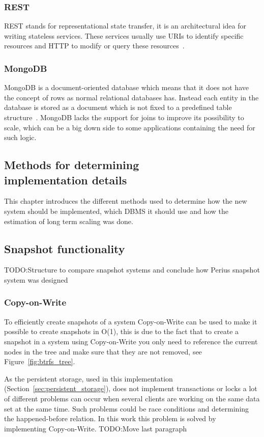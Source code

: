 \documentclass[a4paper,12pt]{article}
\newcommand{\fix}{\colorbox{yellow!30}{TODO:}}
\begin{document}
\subsubsection{REST} 
REST stands for representational state transfer, it is an architectural idea for writing stateless
services. These services usually use URIs to identify specific resources and HTTP to modify or query
these resources~\cite{REST}. 

\subsubsection{MongoDB}
MongoDB is a document-oriented database which means that it does not have the concept of rows as
normal relational databases has. Instead each entity in the database is stored as a document which
is not fixed to a predefined table structure~\cite{MONGODB}. MongoDB lacks the support for joins to
improve its possibility to scale, which can be a big down side to some applications containing the
need for such logic.

\subsection{Methods for determining\\implementation details}
This chapter introduces the different methods used to determine how the new system should be
implemented, which DBMS it should use and how the estimation of long term scaling was done.

\subsection{Snapshot functionality}
\fix Structure to compare snapshot systems and conclude how Perius snapshot system was designed
\subsubsection{Copy-on-Write}
\label{sec:copy-on-write}
To efficiently create snapshots of a system Copy-on-Write can be used to make it possible to create
snapshots in O(1)\cite{BTRFS}, this is due to the fact that to create a snapshot in a system using
Copy-on-Write you only need to reference the current nodes in the tree and make sure that they are
not removed, see Figure~\ref{fig:btrfs_tree}.

As the persistent storage, used in this implementation (Section~\ref{sec:persistent_storage}), does not
implement transactions or locks a lot of different problems can occur when several clients are
working on the same data set at the same time. Such problems could be race conditions and
determining the happened-before relation. In this work this problem is solved by implementing
Copy-on-Write.
\fix Move last paragraph
\end{document}
